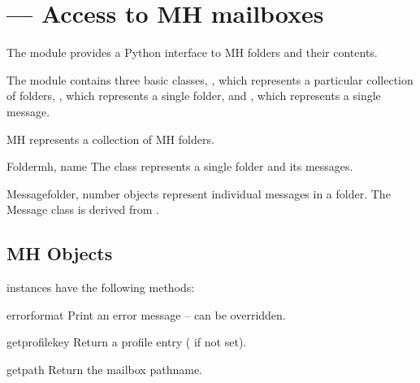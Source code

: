 \section{ ---
         Access to MH mailboxes}




The  module provides a Python interface to MH folders and
their contents.

The module contains three basic classes, , which represents a
particular collection of folders, , which represents a single
folder, and , which represents a single message.


\begin{classdesc}{MH}{}
 represents a collection of MH folders.
\end{classdesc}

\begin{classdesc}{Folder}{mh, name}
The  class represents a single folder and its messages.
\end{classdesc}

\begin{classdesc}{Message}{folder, number}
 objects represent individual messages in a folder.  The
Message class is derived from .
\end{classdesc}


\subsection{MH Objects \label{mh-objects}}

 instances have the following methods:


\begin{methoddesc}[MH]{error}{format}
Print an error message -- can be overridden.
\end{methoddesc}

\begin{methoddesc}[MH]{getprofile}{key}
Return a profile entry ( if not set).
\end{methoddesc}

\begin{methoddesc}[MH]{getpath}{}
Return the mailbox pathname.
\end{methoddesc}

